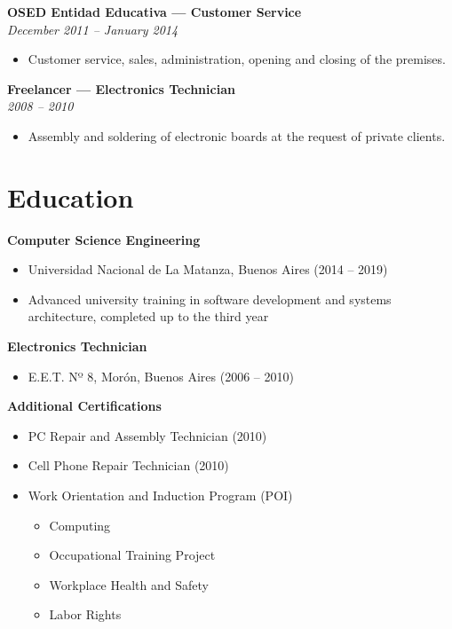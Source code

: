 \documentclass[11pt,a4paper]{article}
\newcommand{\jobtitle}[2]{
    \noindent\textbf{#1}\\
    \textit{#2}\par\vspace{0.5em}
}
\begin{document}
\jobtitle{OSED Entidad Educativa — Customer Service}{December 2011 – January 2014}
\begin{itemize}[leftmargin=*]
    \item Customer service, sales, administration, opening and closing of the premises.
\end{itemize}

\jobtitle{Freelancer — Electronics Technician}{2008 – 2010}
\begin{itemize}[leftmargin=*]
    \item Assembly and soldering of electronic boards at the request of private clients.
\end{itemize}

\section{Education}

\textbf{Computer Science Engineering}
\begin{itemize}[leftmargin=*]
    \item Universidad Nacional de La Matanza, Buenos Aires (2014 – 2019)
    \item Advanced university training in software development and systems architecture, completed up to the third year
\end{itemize}

\textbf{Electronics Technician}
\begin{itemize}[leftmargin=*]
    \item E.E.T. Nº 8, Morón, Buenos Aires (2006 – 2010)
\end{itemize}

\textbf{Additional Certifications}
\begin{itemize}[leftmargin=*]
    \item PC Repair and Assembly Technician (2010)
    \item Cell Phone Repair Technician (2010)
    \item Work Orientation and Induction Program (POI)
    \begin{itemize}
        \item Computing
        \item Occupational Training Project
        \item Workplace Health and Safety
        \item Labor Rights
    \end{itemize}
\end{itemize}
\end{document}
